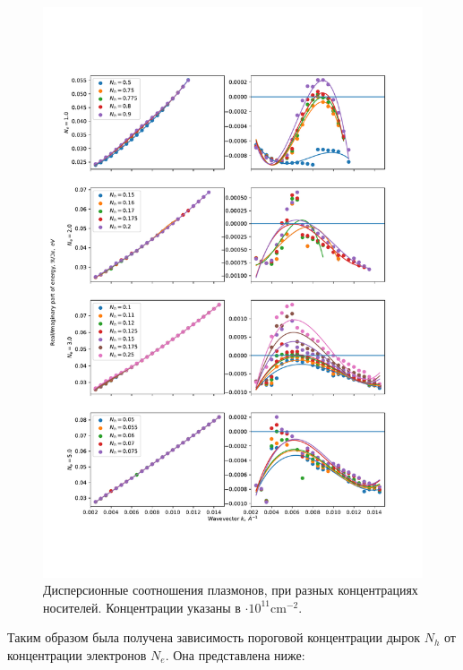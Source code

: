 \documentclass[../main.tex]{subfiles}
\begin{document}
    \begin{figure}[h]
        \begin{minipage}[h]{1\textwidth}
            \includegraphics[width=1\textwidth]{./images/compare_plots_6nm_42K.pdf}
            \caption{Дисперсионные соотношения плазмонов, при разных концентрациях 
            носителей. \label{plasmon:compare_42}
            Концентрации указаны в $\cdot 10^{11} \text{cm}^{-2}$.}
        \end{minipage}
    \end{figure}

    Таким образом была получена зависимость пороговой концентрации дырок 
    $N_h$ от концентрации электронов $N_e$. Она представлена ниже:
\end{document}

